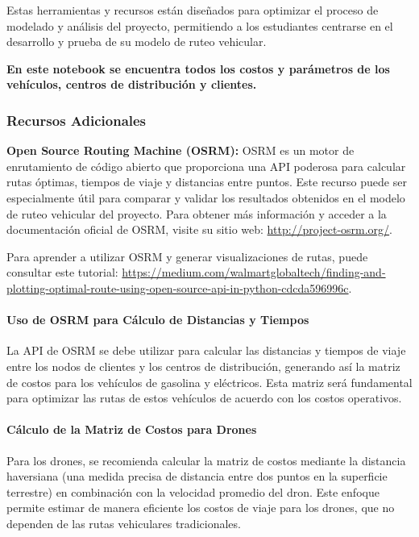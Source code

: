 \documentclass[12pt]{article}
\begin{document}
Estas herramientas y recursos están diseñados para optimizar el proceso de modelado y análisis del proyecto, permitiendo a los estudiantes centrarse en el desarrollo y prueba de su modelo de ruteo vehicular.

\textbf{En este notebook se encuentra todos los costos y parámetros de los vehículos, centros de distribución y clientes.}

\subsubsection{Recursos Adicionales}

\textbf{Open Source Routing Machine (OSRM):} OSRM es un motor de enrutamiento de código abierto que proporciona una API poderosa para calcular rutas óptimas, tiempos de viaje y distancias entre puntos. Este recurso puede ser especialmente útil para comparar y validar los resultados obtenidos en el modelo de ruteo vehicular del proyecto. Para obtener más información y acceder a la documentación oficial de OSRM, visite su sitio web: \url{http://project-osrm.org/}.

Para aprender a utilizar OSRM y generar visualizaciones de rutas, puede consultar este tutorial: \url{https://medium.com/walmartglobaltech/finding-and-plotting-optimal-route-using-open-source-api-in-python-cdcda596996c}.

\paragraph{Uso de OSRM para Cálculo de Distancias y Tiempos}
La API de OSRM se debe utilizar para calcular las distancias y tiempos de viaje entre los nodos de clientes y los centros de distribución, generando así la matriz de costos para los vehículos de gasolina y eléctricos. Esta matriz será fundamental para optimizar las rutas de estos vehículos de acuerdo con los costos operativos.

\paragraph{Cálculo de la Matriz de Costos para Drones}
Para los drones, se recomienda calcular la matriz de costos mediante la distancia haversiana (una medida precisa de distancia entre dos puntos en la superficie terrestre) en combinación con la velocidad promedio del dron. Este enfoque permite estimar de manera eficiente los costos de viaje para los drones, que no dependen de las rutas vehiculares tradicionales.
\end{document}
